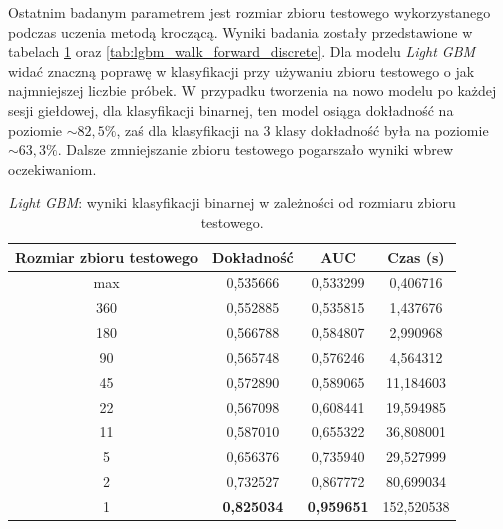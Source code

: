 \documentclass[a4paper, twoside, 11pt, openright]{article}
\begin{document}
Ostatnim badanym parametrem jest rozmiar zbioru testowego wykorzystanego podczas uczenia metodą kroczącą. Wyniki badania zostały przedstawione w tabelach \ref{tab:lgbm_walk_forward_binary} oraz \ref{tab:lgbm_walk_forward_discrete}. Dla modelu \textit{Light GBM} widać znaczną poprawę w klasyfikacji przy używaniu zbioru testowego o jak najmniejszej liczbie próbek. W przypadku tworzenia na nowo modelu po każdej sesji giełdowej, dla klasyfikacji binarnej, ten model osiąga dokładność na poziomie $\sim 82,5\%$, zaś dla klasyfikacji na 3 klasy dokładność była na poziomie $\sim 63,3\%$. Dalsze zmniejszanie zbioru testowego pogarszało wyniki wbrew oczekiwaniom.

\begin{table}[H]
    \centering
    \begin{tabular}{|c|c|c|c|}
    \hline
        \textbf{Rozmiar zbioru testowego} & \textbf{Dokładność} & \textbf{AUC} & \textbf{Czas (s)} \\ \hline
max   						  & 0,535666 &  0,533299 &  0,406716 \\ \hline
360                         &  0,552885 &  0,535815 &    1,437676 \\ \hline
180                        &  0,566788 &  0,584807 &    2,990968 \\ \hline
90                         &  0,565748 &  0,576246 &    4,564312 \\ \hline
45                         &  0,572890 &  0,589065 &   11,184603 \\ \hline
22                          &  0,567098 &  0,608441 &   19,594985 \\ \hline
11                          &  0,587010 &  0,655322 &   36,808001 \\ \hline
5                           &  0,656376 &  0,735940 &   29,527999 \\ \hline
2                           &  0,732527 &  0,867772 &   80,699034 \\ \hline
1                           &  \textbf{0,825034} &  \textbf{0,959651} &  152,520538 \\ \hline

    \end{tabular}
    \caption{\textit{Light GBM}: wyniki klasyfikacji binarnej w zależności od rozmiaru zbioru testowego.}
    \label{tab:lgbm_walk_forward_binary}
\end{table}
\end{document}
